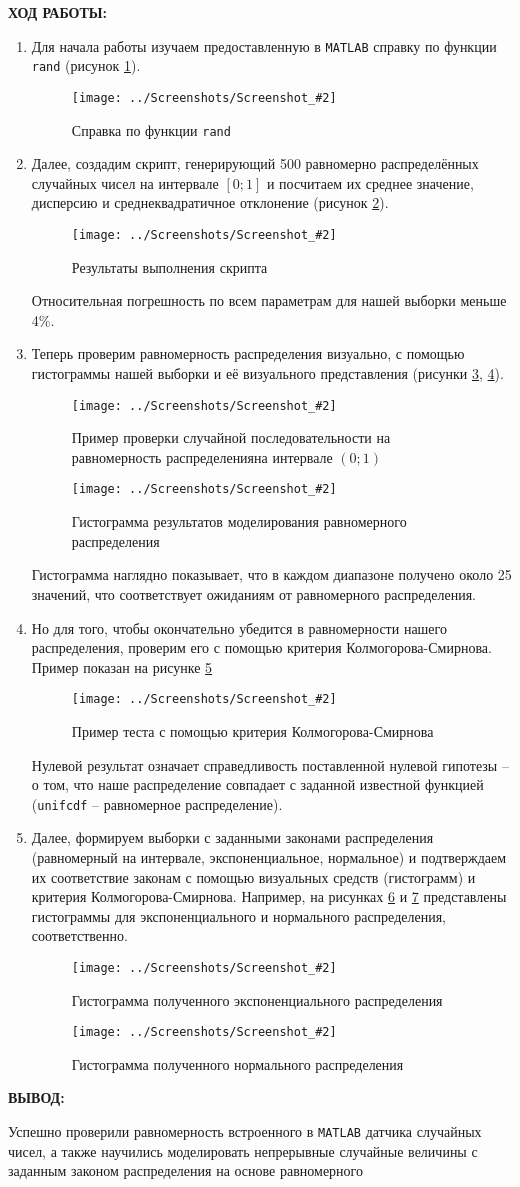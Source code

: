 \documentclass[14pt,a4paper]{extreport}
\newcommand{\screenshot}[2]{\begin{figure}[ht]%
\centering\texttt{[image: ../Screenshots/Screenshot\_\#2]}%
\caption{#1}%
\label{picture#2}%
\end{figure}%
}
\newcommand{\header}[1]{%
{
\clearpage%
\fontsize{16pt}{14pt}\selectfont
\begin{center}
\textbf{\MakeUppercase{#1}:}
\end{center}
}
}
\newcommand{\matlab}{\texttt{\MakeUppercase{matlab}}}
\begin{document}
\header{Ход работы}

\begin{enumerate}

\item Для начала работы изучаем предоставленную в \matlab {} справку по функции \texttt{rand} (рисунок \ref{picture1}).

\screenshot{Справка по функции \texttt{rand}}{1}

\item Далее, создадим скрипт, генерирующий 500 равномерно распределённых случайных чисел на интервале $[0; 1]$ и посчитаем их среднее значение, дисперсию и среднеквадратичное отклонение (рисунок \ref{picture2}).

\screenshot{Результаты выполнения скрипта}{2}

Относительная погрешность по всем параметрам для нашей выборки меньше 4\%.

\item Теперь проверим равномерность распределения визуально, с помощью гистограммы нашей выборки и её визуального представления (рисунки \ref{picture3}, \ref{picture4}).

\screenshot{{Пример проверки случайной последовательности на равномерность распределенияна интервале $(0; 1)$}}{3}

\screenshot{Гистограмма результатов моделирования равномерного распределения}{4}

Гистограмма наглядно показывает, что в каждом диапазоне получено около 25 значений, что соответствует ожиданиям от равномерного распределения.

\item Но для того, чтобы окончательно убедится в равномерности нашего распределения, проверим его с помощью критерия Колмогорова-Смирнова. Пример показан на рисунке \ref{picture5}

\screenshot{Пример теста с помощью критерия Колмогорова-Смирнова}{5}

Нулевой результат означает справедливость поставленной нулевой гипотезы – о том, что наше распределение совпадает с заданной известной функцией (\texttt{unifcdf} {} – равномерное распределение).

\item Далее, формируем выборки с заданными законами распределения (равномерный на интервале, экспоненциальное, нормальное) и подтверждаем их соответствие законам с помощью визуальных средств (гистограмм) и критерия Колмогорова-Смирнова. Например, на рисунках \ref{picture6} и \ref{picture7} представлены гистограммы для экспоненциального и нормального распределения, соответственно.

\screenshot{Гистограмма полученного экспоненциального распределения}{6}

\screenshot{Гистограмма полученного нормального распределения}{7}

\end{enumerate}

\header{Вывод}

Успешно проверили равномерность встроенного в \matlab {} датчика случайных чисел, а также научились моделировать непрерывные случайные величины с заданным законом распределения на основе равномерного
\end{document}
